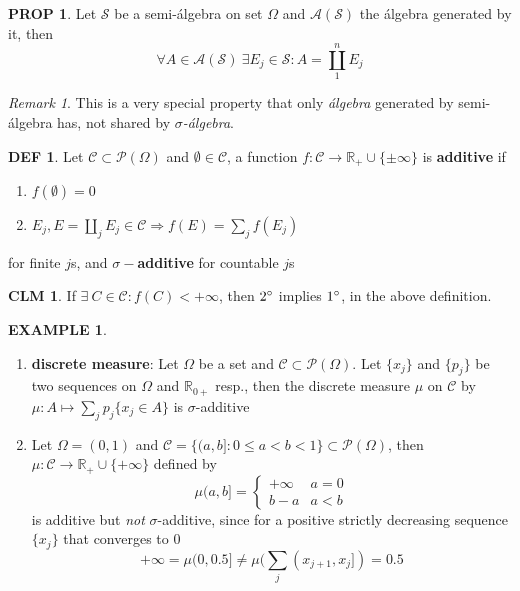 \documentclass[hidelinks]{article}
\theoremstyle{definition}
\newtheorem*{defin}{DEF}
\newtheorem*{eg}{EXAMPLE}
\theoremstyle{dotless}
\newtheorem{proposition}{PROP}[section]
\newtheorem{claim}{CLM}[section]
\theoremstyle{remark}
\newtheorem*{remark}{Remark}
\begin{document}
\begin{proposition}\label{Prop 1.1}
Let $\mathscr{S}$ be a semi-álgebra on set $\Omega$ and $\mathscr{A}(\mathscr{S})$ the álgebra generated by it, then
\[\forall A\in\mathscr{A}(\mathscr{S})\ \exists E_j\in\mathscr{S}:A=\coprod_1^nE_j \]
\end{proposition}

\begin{remark}
This is a very special property that only \emph{álgebra} generated by semi-álgebra has, not shared by \emph{$\sigma$-álgebra}.
\end{remark}

\begin{defin}
Let $\mathscr{C}\subset\mathscr{P}(\Omega)$ and $\emptyset\in\mathscr{C}$, a function $f:\mathscr{C}\to\mathbb{R}_+\cup\{\pm\infty\}$ is \textbf{additive} if
\begin{enumerate}[label=\arabic*\degree]
    \item $f(\emptyset)=0$
    \item $E_j,E=\coprod\limits_jE_j\in\mathscr{C}\Rightarrow f(E)=\sum\limits_jf(E_j)$
\end{enumerate} for finite $j$s, and \textbf{$\sigma-$additive} for countable $j$s
\end{defin}

\begin{claim}
If $\exists\ C\in\mathscr{C}:f(C)<+\infty$, then $2\degree$ implies $1\degree$, in the above definition.
\end{claim}

\begin{eg}~
\begin{enumerate}[label=\arabic*\degree]
    \item \textbf{discrete measure}: Let $\Omega$ be a set and $\mathscr{C}\subset\mathscr{P}(\Omega)$. Let $\{x_j\}$ and $\{p_j\}$ be two sequences on $\Omega$ and $\mathbb{R}_{0+}$ resp., then the discrete measure $\mu$ on $\mathscr{C}$ by $\mu:A\mapsto\sum_jp_j\{x_j\in A\}$ is $\sigma$-additive
    \item Let $\Omega=(0,1)$ and $\mathscr{C}=\{(a,b]:0\leq a<b<1\}\subset\mathscr{P}(\Omega)$, then $\mu:\mathscr{C}\to\mathbb{R}_+\cup\{+\infty\}$ defined by
    \[\mu(a,b]=
    \begin{cases} 
      +\infty & a=0 \\
      b-a & a<b
   \end{cases}
\]
is additive but \emph{not} $\sigma$-additive, since for a positive strictly decreasing sequence $\{x_j\}$ that converges to 0
\[+\infty=\mu(0,0.5]\neq\mu(\sum_j(x_{j+1},x_j])=0.5\]
\end{enumerate}
\end{eg}
\end{document}
